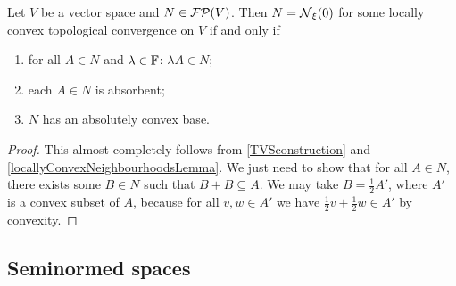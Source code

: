 \begin{proposition} \label{LCTVSconstruction}
Let $V$ be a vector space and $N\in\operatorname{\mathcal{FP}}(V)$. Then $N = \operatorname{\mathcal{N}}_\xi(0)$ for some locally convex topological convergence on $V$ \textup{if and only if}
\begin{enumerate}
\item for all $A\in N$ and $\lambda\in \mathbb{F}$: $\lambda A\in N$;
\item each $A \in N$ is absorbent;
\item $N$ has an absolutely convex base.
\end{enumerate}
\end{proposition}
\begin{proof}
This almost completely follows from \ref{TVSconstruction} and \ref{locallyConvexNeighbourhoodsLemma}. We just need to show that for all $A\in N$, there exists some $B\in N$ such that $B+B\subseteq A$. We may take $B = \frac{1}{2}A'$, where $A'$ is a convex subset of $A$, because for all $v,w\in A'$ we have $\frac{1}{2}v + \frac{1}{2}w \in A'$ by convexity.
\end{proof}

\subsection{Seminormed spaces}

